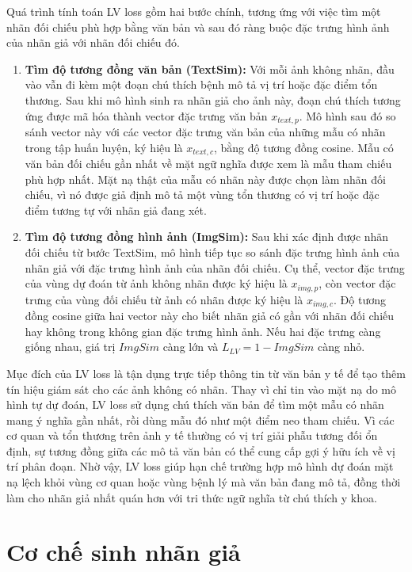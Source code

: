 Quá trình tính toán LV loss gồm hai bước chính, tương ứng với việc tìm một nhãn đối chiếu phù hợp bằng văn bản và sau đó ràng buộc đặc trưng hình ảnh của nhãn giả với nhãn đối chiếu đó.

\begin{enumerate}
    \item \textbf{Tìm độ tương đồng văn bản (TextSim):} Với mỗi ảnh không nhãn, đầu vào vẫn đi kèm một đoạn chú thích bệnh mô tả vị trí hoặc đặc điểm tổn thương. Sau khi mô hình sinh ra nhãn giả cho ảnh này, đoạn chú thích tương ứng được mã hóa thành vector đặc trưng văn bản $x_{text,p}$. Mô hình sau đó so sánh vector này với các vector đặc trưng văn bản của những mẫu có nhãn trong tập huấn luyện, ký hiệu là $x_{text,c}$, bằng độ tương đồng cosine. Mẫu có văn bản đối chiếu gần nhất về mặt ngữ nghĩa được xem là mẫu tham chiếu phù hợp nhất. Mặt nạ thật của mẫu có nhãn này được chọn làm nhãn đối chiếu, vì nó được giả định mô tả một vùng tổn thương có vị trí hoặc đặc điểm tương tự với nhãn giả đang xét.
    
    \item \textbf{Tìm độ tương đồng hình ảnh (ImgSim):} Sau khi xác định được nhãn đối chiếu từ bước TextSim, mô hình tiếp tục so sánh đặc trưng hình ảnh của nhãn giả với đặc trưng hình ảnh của nhãn đối chiếu. Cụ thể, vector đặc trưng của vùng dự đoán từ ảnh không nhãn được ký hiệu là $x_{img,p}$, còn vector đặc trưng của vùng đối chiếu từ ảnh có nhãn được ký hiệu là $x_{img,c}$. Độ tương đồng cosine giữa hai vector này cho biết nhãn giả có gần với nhãn đối chiếu hay không trong không gian đặc trưng hình ảnh. Nếu hai đặc trưng càng giống nhau, giá trị $ImgSim$ càng lớn và $L_{LV} = 1 - ImgSim$ càng nhỏ.
\end{enumerate}

Mục đích của LV loss là tận dụng trực tiếp thông tin từ văn bản y tế để tạo thêm tín hiệu giám sát cho các ảnh không có nhãn. Thay vì chỉ tin vào mặt nạ do mô hình tự dự đoán, LV loss sử dụng chú thích văn bản để tìm một mẫu có nhãn mang ý nghĩa gần nhất, rồi dùng mẫu đó như một điểm neo tham chiếu. Vì các cơ quan và tổn thương trên ảnh y tế thường có vị trí giải phẫu tương đối ổn định, sự tương đồng giữa các mô tả văn bản có thể cung cấp gợi ý hữu ích về vị trí phân đoạn. Nhờ vậy, LV loss giúp hạn chế trường hợp mô hình dự đoán mặt nạ lệch khỏi vùng cơ quan hoặc vùng bệnh lý mà văn bản đang mô tả, đồng thời làm cho nhãn giả nhất quán hơn với tri thức ngữ nghĩa từ chú thích y khoa.

\section{Cơ chế sinh nhãn giả}

